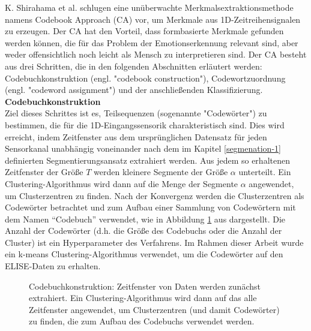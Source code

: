 K. Shirahama et al. \cite{kimiaki_codebook_approach_2016} schlugen eine unüberwachte Merkmalsextraktionsmethode namens Codebook Approach (CA) vor, um Merkmale aus 1D-Zeitreihensignalen zu erzeugen.
Der CA hat den Vorteil, dass formbasierte Merkmale gefunden werden können, die für das Problem der Emotionserkennung relevant sind, aber weder offensichtlich noch leicht als Mensch zu interpretieren sind. 
Der CA besteht aus drei Schritten, die in den folgenden Abschnitten erläutert werden: Codebuchkonstruktion (engl. "codebook construction"), Codewortzuordnung (engl. "codeword assignment") und der anschließenden Klassifizierung. \\


\textbf{Codebuchkonstruktion \\}
Ziel dieses Schrittes ist es, Teilsequenzen (sogenannte "Codewörter") zu bestimmen, die für die 1D-Eingangssensorik charakteristisch sind. 
Dies wird erreicht, indem Zeitfenster aus dem ursprünglichen Datensatz für jeden Sensorkanal unabhängig voneinander nach dem im Kapitel \ref{segmenation-1} definierten Segmentierungsansatz extrahiert werden.
Aus jedem so erhaltenen Zeitfenster der Größe $T$ werden kleinere Segmente der Größe $\alpha$ unterteilt.
Ein Clustering-Algorithmus wird dann auf die Menge der Segmente $\alpha$ angewendet, um Clusterzentren zu finden.
Nach der Konvergenz werden die Clusterzentren als Codewörter betrachtet und zum Aufbau einer Sammlung von Codewörtern mit dem Namen ``Codebuch'' verwendet, wie in Abbildung \ref{fig:ca_construction} aus \cite{kimiaki_codebook_approach_2016} dargestellt. 
Die Anzahl der Codewörter (d.h. die Größe des Codebuchs oder die Anzahl der Cluster) ist ein Hyperparameter des Verfahrens. Im Rahmen dieser Arbeit wurde ein k-means Clustering-Algorithmus verwendet, um die Codewörter auf den ELISE-Daten zu erhalten. \\


\begin{figure}[h]
\caption[Codebuchkonstruktion]{Codebuchkonstruktion: Zeitfenster von Daten werden zunächst extrahiert. Ein Clustering-Algorithmus wird dann auf das alle Zeitfenster angewendet, um Clusterzentren (und damit Codewörter) zu finden, die zum Aufbau des Codebuchs verwendet werden. }
\label{fig:ca_construction} \end{figure} \vspace{0.5cm}


